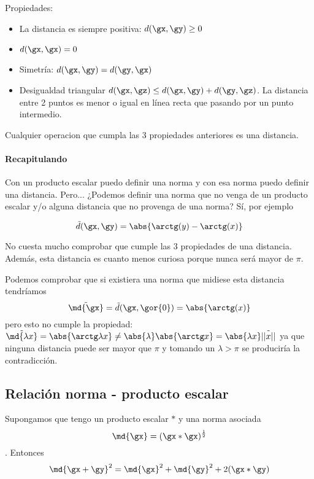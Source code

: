 \documentclass{apuntes}
\begin{document}
Propiedades:
\begin{itemize}
 \item La distancia es siempre positiva: $d(\gx,\gy)\ge 0$
 \item $d(\gx,\gx) = 0$
 \item Simetría: $d(\gx,\gy) = d(\gy, \gx)$
 \item Desigualdad triangular $d(\gx,\gz) \leq d(\gx,\gy) + d(\gy,\gz)$. La distancia entre 2 puntos es menor o igual en línea recta que pasando por un punto intermedio.
\end{itemize}


\begin{defn}[Distancia] Cualquier operacion que cumpla las 3 propiedades anteriores es una distancia. \end{defn}

\paragraph{Recapitulando}
Con un producto escalar puedo definir una norma y con esa norma puedo definir una distancia. Pero... ¿Podemos definir una norma 
que no venga de un producto escalar y/o alguna distancia que no provenga de una norma? Sí, por ejemplo

\[ \tilde{d} (\gx,\gy) = \abs{\arctg(y) - \arctg(x)} \] 

No cuesta mucho comprobar que cumple las 3 propiedades de una distancia. Además, esta distancia es cuanto menos curiosa porque nunca será mayor de $\pi$.

 Podemos comprobar que si existiera una norma que midiese esta distancia tendríamos \[\tilde{\md{\gx}} = \tilde{d} (\gx,\gor{0}) = \abs{\arctg (x)} \]
 pero esto no cumple la propiedad: $\tilde{\md{\lambda x}} = \abs{\arctg \lambda x} \neq \abs{\lambda}\abs{\arctg x} = 
 \abs{\lambda x}\tilde{||x||}$
 ya que ninguna distancia puede ser mayor que $\pi$ y tomando un $\lambda > \pi$ se produciría la contradicción.

\subsection{Relación norma - producto escalar}
\label{secNormaprodEsc}
\begin{theorem}
Supongamos que tengo un producto escalar $\ast$ y una norma asociada \[ \md{\gx} = (\gx\ast \gx) ^ {\frac{1}{2}}\]. Entonces \[ \md{\gx + \gy}^ 2 =  \md{\gx} ^ 2 + \md{\gy} ^ 2+2(\gx\ast\gy) \]
\end{theorem}
\end{document}

